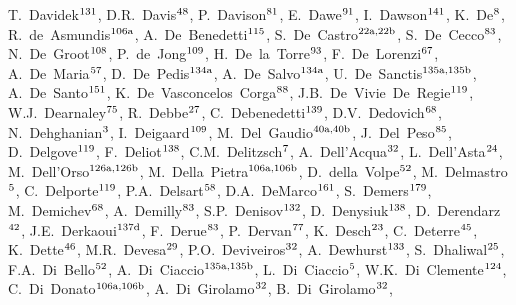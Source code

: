 \begin{flushleft}
T.~Davidek$^\textrm{\scriptsize 131}$,
D.R.~Davis$^\textrm{\scriptsize 48}$,
P.~Davison$^\textrm{\scriptsize 81}$,
E.~Dawe$^\textrm{\scriptsize 91}$,
I.~Dawson$^\textrm{\scriptsize 141}$,
K.~De$^\textrm{\scriptsize 8}$,
R.~de~Asmundis$^\textrm{\scriptsize 106a}$,
A.~De~Benedetti$^\textrm{\scriptsize 115}$,
S.~De~Castro$^\textrm{\scriptsize 22a,22b}$,
S.~De~Cecco$^\textrm{\scriptsize 83}$,
N.~De~Groot$^\textrm{\scriptsize 108}$,
P.~de~Jong$^\textrm{\scriptsize 109}$,
H.~De~la~Torre$^\textrm{\scriptsize 93}$,
F.~De~Lorenzi$^\textrm{\scriptsize 67}$,
A.~De~Maria$^\textrm{\scriptsize 57}$,
D.~De~Pedis$^\textrm{\scriptsize 134a}$,
A.~De~Salvo$^\textrm{\scriptsize 134a}$,
U.~De~Sanctis$^\textrm{\scriptsize 135a,135b}$,
A.~De~Santo$^\textrm{\scriptsize 151}$,
K.~De~Vasconcelos~Corga$^\textrm{\scriptsize 88}$,
J.B.~De~Vivie~De~Regie$^\textrm{\scriptsize 119}$,
W.J.~Dearnaley$^\textrm{\scriptsize 75}$,
R.~Debbe$^\textrm{\scriptsize 27}$,
C.~Debenedetti$^\textrm{\scriptsize 139}$,
D.V.~Dedovich$^\textrm{\scriptsize 68}$,
N.~Dehghanian$^\textrm{\scriptsize 3}$,
I.~Deigaard$^\textrm{\scriptsize 109}$,
M.~Del~Gaudio$^\textrm{\scriptsize 40a,40b}$,
J.~Del~Peso$^\textrm{\scriptsize 85}$,
D.~Delgove$^\textrm{\scriptsize 119}$,
F.~Deliot$^\textrm{\scriptsize 138}$,
C.M.~Delitzsch$^\textrm{\scriptsize 7}$,
A.~Dell'Acqua$^\textrm{\scriptsize 32}$,
L.~Dell'Asta$^\textrm{\scriptsize 24}$,
M.~Dell'Orso$^\textrm{\scriptsize 126a,126b}$,
M.~Della~Pietra$^\textrm{\scriptsize 106a,106b}$,
D.~della~Volpe$^\textrm{\scriptsize 52}$,
M.~Delmastro$^\textrm{\scriptsize 5}$,
C.~Delporte$^\textrm{\scriptsize 119}$,
P.A.~Delsart$^\textrm{\scriptsize 58}$,
D.A.~DeMarco$^\textrm{\scriptsize 161}$,
S.~Demers$^\textrm{\scriptsize 179}$,
M.~Demichev$^\textrm{\scriptsize 68}$,
A.~Demilly$^\textrm{\scriptsize 83}$,
S.P.~Denisov$^\textrm{\scriptsize 132}$,
D.~Denysiuk$^\textrm{\scriptsize 138}$,
D.~Derendarz$^\textrm{\scriptsize 42}$,
J.E.~Derkaoui$^\textrm{\scriptsize 137d}$,
F.~Derue$^\textrm{\scriptsize 83}$,
P.~Dervan$^\textrm{\scriptsize 77}$,
K.~Desch$^\textrm{\scriptsize 23}$,
C.~Deterre$^\textrm{\scriptsize 45}$,
K.~Dette$^\textrm{\scriptsize 46}$,
M.R.~Devesa$^\textrm{\scriptsize 29}$,
P.O.~Deviveiros$^\textrm{\scriptsize 32}$,
A.~Dewhurst$^\textrm{\scriptsize 133}$,
S.~Dhaliwal$^\textrm{\scriptsize 25}$,
F.A.~Di~Bello$^\textrm{\scriptsize 52}$,
A.~Di~Ciaccio$^\textrm{\scriptsize 135a,135b}$,
L.~Di~Ciaccio$^\textrm{\scriptsize 5}$,
W.K.~Di~Clemente$^\textrm{\scriptsize 124}$,
C.~Di~Donato$^\textrm{\scriptsize 106a,106b}$,
A.~Di~Girolamo$^\textrm{\scriptsize 32}$,
B.~Di~Girolamo$^\textrm{\scriptsize 32}$,

\end{flushleft}
